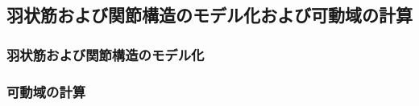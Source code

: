 \subsection{羽状筋および関節構造のモデル化および可動域の計算}
\subsubsection{羽状筋および関節構造のモデル化}

\subsubsection{可動域の計算}







